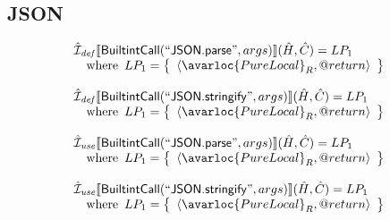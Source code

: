 \subsection{JSON}
\[
\begin{array}{l}

\aI_{\it def}\lbr \SF{BuiltintCall}(``\SF{JSON.parse}",args)\rbr(\hat{H},\hat{C})
  = LP_1\\
\quad\wherec{
  LP_1 = \set{\langle\avarloc{PureLocal}_R,\varprop{return}\rangle}\\
  }\\
\\


\aI_{\it def}\lbr \SF{BuiltintCall}(``\SF{JSON.stringify}",args)\rbr(\hat{H},\hat{C})
  = LP_1\\
\quad\wherec{
  LP_1 = \set{\langle\avarloc{PureLocal}_R,\varprop{return}\rangle}\\
  }\\
\\


\aI_{\it use}\lbr \SF{BuiltintCall}(``\SF{JSON.parse}",args)\rbr(\hat{H},\hat{C})
  = LP_1\\
\quad\wherec{
  LP_1 = \set{\langle\avarloc{PureLocal}_R,\varprop{return}\rangle}\\
  }\\
\\

\aI_{\it use}\lbr \SF{BuiltintCall}(``\SF{JSON.stringify}",args)\rbr(\hat{H},\hat{C})
  = LP_1\\
\quad\wherec{
  LP_1 = \set{\langle\avarloc{PureLocal}_R,\varprop{return}\rangle}\\
  }\\
\\

\end{array}
\]


 
